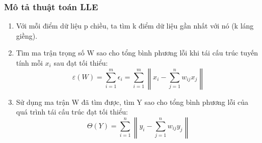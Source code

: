 \subsubsection{Mô tả thuật toán LLE}
\begin{enumerate}
	\item Với mỗi điểm dữ liệu p chiều, ta tìm k điểm dữ liệu gần nhất với nó (k láng giềng).
	\item Tìm ma trận trọng số W sao cho tổng bình phương lỗi khi tái cấu trúc tuyến tính mỗi $x_i$ sau đạt tối thiểu:
	\begin{equation}
		\varepsilon(W) = \sum_{i=1}^{m}{\epsilon_i} = \sum_{i=1}^{m}{\left\|x_i - \sum_{j=1}^{n}{w_{ij}x_j}\right\|}
	\end{equation}
	\item Sử dụng ma trận W đã tìm được, tìm Y sao cho tổng bình phương lỗi của quá trình tái cấu trúc đạt tối thiểu:
	\begin{equation}
		\Theta(Y) = \sum_{i=1}^{n}{\left\|y_i - \sum_{j=1}^{n}{w_{ij}y_j}\right\|}
	\end{equation}
\end{enumerate}

